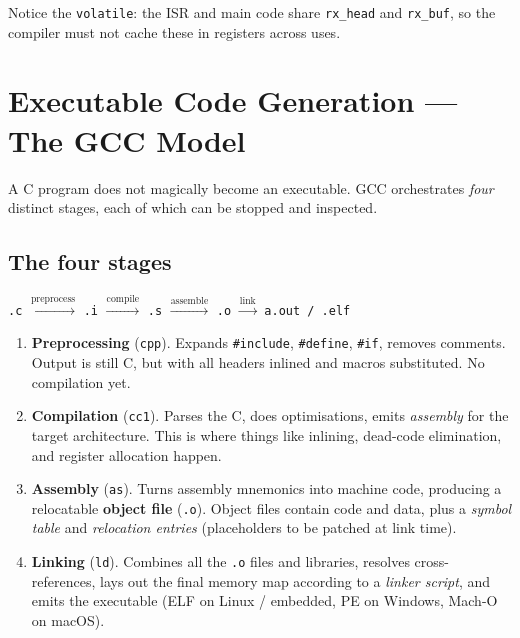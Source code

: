 \documentclass[11pt,a4paper]{article}
\begin{document}
Notice the \texttt{volatile}: the ISR and main code share \texttt{rx\_head}
and \texttt{rx\_buf}, so the compiler must not cache these in registers
across uses.

\section{Executable Code Generation --- The GCC Model}

A C program does not magically become an executable. GCC orchestrates
\emph{four} distinct stages, each of which can be stopped and inspected.

\subsection{The four stages}

\begin{center}
\texttt{.c} $\xrightarrow{\text{preprocess}}$ \texttt{.i}
        $\xrightarrow{\text{compile}}$ \texttt{.s}
        $\xrightarrow{\text{assemble}}$ \texttt{.o}
        $\xrightarrow{\text{link}}$ \texttt{a.out / .elf}
\end{center}

\begin{enumerate}[leftmargin=*]
    \item \textbf{Preprocessing} (\texttt{cpp}). Expands \texttt{\#include},
    \texttt{\#define}, \texttt{\#if}, removes comments. Output is still C,
    but with all headers inlined and macros substituted. No compilation yet.
    \item \textbf{Compilation} (\texttt{cc1}). Parses the C, does optimisations,
    emits \emph{assembly} for the target architecture. This is where things
    like inlining, dead-code elimination, and register allocation happen.
    \item \textbf{Assembly} (\texttt{as}). Turns assembly mnemonics into
    machine code, producing a relocatable \textbf{object file} (\texttt{.o}).
    Object files contain code and data, plus a \emph{symbol table} and
    \emph{relocation entries} (placeholders to be patched at link time).
    \item \textbf{Linking} (\texttt{ld}). Combines all the \texttt{.o} files
    and libraries, resolves cross-references, lays out the final memory map
    according to a \emph{linker script}, and emits the executable (ELF on
    Linux / embedded, PE on Windows, Mach-O on macOS).
\end{enumerate}
\end{document}
